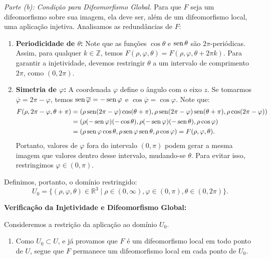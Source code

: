 {	\textit{Parte (b): Condição para Difeomorfismo Global.}
	Para que $F$ seja um difeomorfismo sobre sua imagem, ela deve ser, além de um difeomorfismo local, uma aplicação injetiva. Analisamos as redundâncias de $F$:
	
	\begin{enumerate}
		\item \textbf{Periodicidade de $\theta$:} Note que as funções $\cos \theta$ e $\operatorname{sen} \theta$ são $2\pi$-periódicas. Assim, para qualquer $k \in \mathbb{Z}$, temos $F(\rho, \varphi, \theta) = F(\rho, \varphi, \theta + 2\pi k)$. Para garantir a injetividade, devemos restringir $\theta$ a um intervalo de comprimento $2\pi$, como $(0, 2\pi)$.
		
		\item \textbf{Simetria de $\varphi$:} A coordenada $\varphi$ define o ângulo com o eixo $z$. Se tomarmos $\overline{\varphi} = 2\pi - \varphi$, temos $\operatorname{sen} \overline{\varphi} = -\operatorname{sen} \varphi$ e $\cos \overline{\varphi} = \cos \varphi$. Note que:
		\begin{align*}
			F(\rho, 2\pi - \varphi, \theta + \pi) &= (\rho \operatorname{sen}(2\pi - \varphi) \cos(\theta + \pi), \rho \operatorname{sen}(2\pi - \varphi) \operatorname{sen}(\theta + \pi), \rho \cos(2\pi - \varphi)) \\
			&= (\rho (-\operatorname{sen} \varphi) (-\cos \theta), \rho (-\operatorname{sen} \varphi) (-\operatorname{sen} \theta), \rho \cos \varphi) \\
			&= (\rho \operatorname{sen} \varphi \cos \theta, \rho \operatorname{sen} \varphi \operatorname{sen} \theta, \rho \cos \varphi) = F(\rho, \varphi, \theta).
		\end{align*}
		Portanto, valores de $\varphi$ fora do intervalo $(0, \pi)$ podem gerar a mesma imagem que valores dentro desse intervalo, mudando-se $\theta$. Para evitar isso, restringimos $\varphi \in (0, \pi)$.
	\end{enumerate}
	
	Definimos, portanto, o domínio restringido:
	\begin{equation*}
		U_0 = \{ (\rho, \varphi, \theta) \in \mathbb{R}^3 \mid \rho \in (0, \infty), \varphi \in (0, \pi), \theta \in (0, 2\pi) \}.
	\end{equation*}
	
	\textbf{Verificação da Injetividade e Difeomorfismo Global:}
	
	Consideremos a restrição da aplicação ao domínio $U_0$.
	\begin{enumerate}
		\item Como $U_0 \subset U$, e já provamos que $F$ é um difeomorfismo local em todo ponto de $U$, segue que $F$ permanece um difeomorfismo local em cada ponto de $U_0$.
		

\end{enumerate}}
